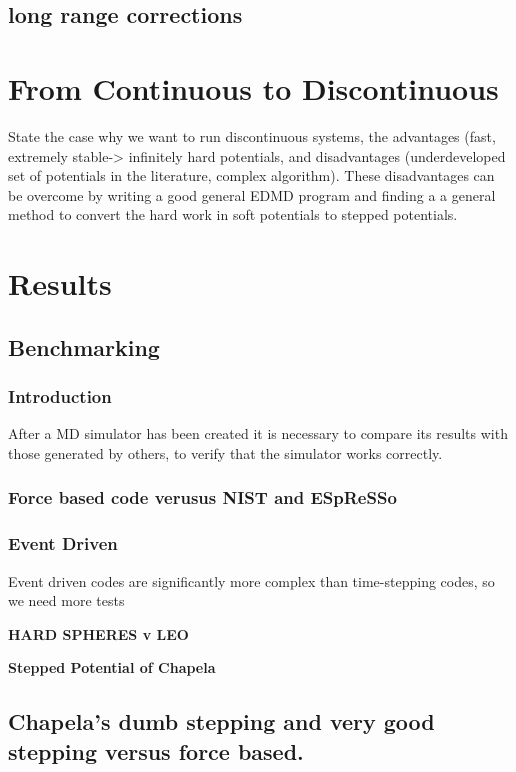 \documentclass[12pt]{UoAthesis}
\begin{document}
\section{long range corrections}

\chapter{From Continuous to Discontinuous}
State the case why we want to run discontinuous systems, the
advantages (fast, extremely stable-> infinitely hard potentials, and
disadvantages (underdeveloped set of potentials in the literature,
complex algorithm). These disadvantages can be overcome by writing a
good general EDMD program and finding a a general method to convert
the hard work in soft potentials to stepped potentials. 


\chapter{Results} 

\section{Benchmarking} 

\subsection{Introduction} 
After a MD simulator has been created it is necessary to compare its
results with those generated by others, to verify that the simulator
works correctly.

\subsection{Force based code verusus NIST and ESpReSSo}

\subsection{Event Driven}
Event driven codes are significantly more complex than time-stepping codes, so we need more tests

{\bf HARD SPHERES v LEO}

{\bf Stepped Potential of Chapela}

\section{Chapela's dumb stepping and very good stepping versus force based. }
\end{document}
